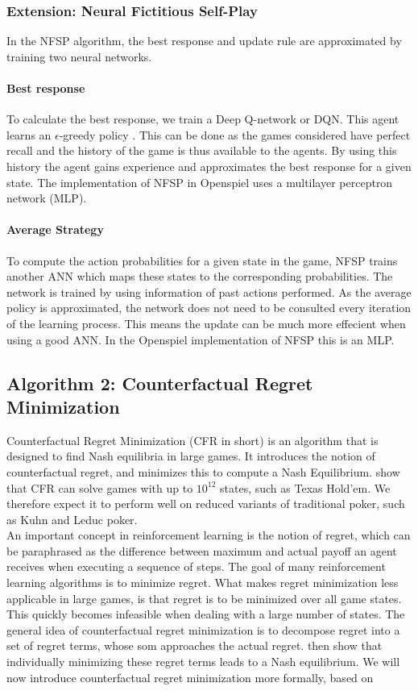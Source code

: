 \documentclass[10pt,a4paper]{article}
\begin{document}
\subsubsection{Extension: Neural Fictitious Self-Play}
\label{sub:nfsp}
In the NFSP algorithm, the best response and update rule are approximated by training two neural networks.
\paragraph{Best response}
To calculate the best response, we train a Deep Q-network or DQN. This agent learns an $\epsilon$-greedy policy \cite{heinrichphd}. 
This can be done as the games considered have perfect recall and the history of the game is thus available to the agents. By using this history the agent gains experience and approximates the best response for a given state.
The implementation of NFSP in Openspiel uses a multilayer perceptron network (MLP).
\paragraph{Average Strategy}
To compute the action probabilities for a given state in the game, NFSP trains another ANN which maps these states to the corresponding probabilities. The network is trained by using information of past actions performed. As the average policy is approximated, the network does not need to be consulted every iteration of the learning process. This means the update can be much more effecient when using a good ANN.
In the Openspiel implementation of NFSP this is an MLP.
\subsection{Algorithm 2: Counterfactual Regret Minimization}
\label{sub:cfr}
Counterfactual Regret Minimization (CFR in short) is an algorithm that is designed to find Nash equilibria in large games. It introduces the notion of counterfactual regret, and minimizes this to compute a Nash Equilibrium. \citeauthor{cfr} \citep{cfr} show that CFR can solve games with up to $10^{12}$ states, such as Texas Hold'em. We therefore expect it to perform well on reduced variants of traditional poker, such as Kuhn and Leduc poker.\\

An important concept in reinforcement learning is the notion of regret, which can be paraphrased as the difference between maximum and actual payoff an agent receives when executing a sequence of steps. The goal of many reinforcement learning algorithms is to minimize regret. What makes regret minimization less applicable in large games, is that regret is to be minimized over all game states. This quickly becomes infeasible when dealing with a large number of states. The general idea of counterfactual regret minimization is to decompose regret into a set of regret terms, whose som approaches the actual regret. \citeauthor{cfr} then show that individually minimizing these regret terms leads to a Nash equilibrium. We will now introduce counterfactual regret minimization more formally, based on \citep{cfr_for_beginners}\\
\end{document}
